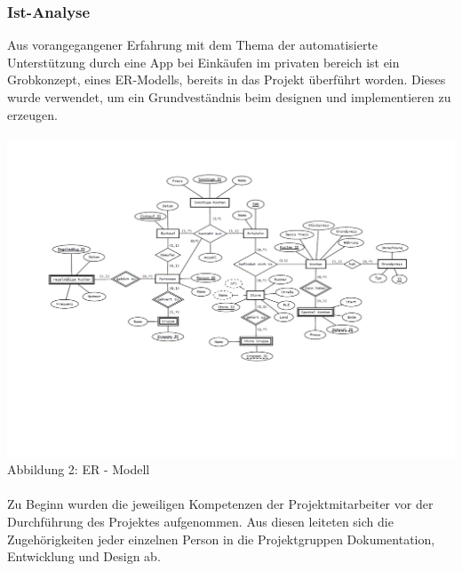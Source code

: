 \documentclass[12pt,a4paper]{article}
\begin{document}
\subsubsection{Ist-Analyse}
Aus vorangegangener Erfahrung mit dem Thema der automatisierte Unterstützung durch eine App bei Einkäufen im privaten bereich ist ein Grobkonzept, eines ER-Modells, bereits in das Projekt überführt worden. Dieses wurde verwendet, um ein Grundveständnis beim designen und implementieren zu erzeugen. 
\\
\\
\hspace*{-20mm} 
\includegraphics[trim = 15mm 40mm 0mm 20mm, clip, scale=0.7]{ER-Modell.pdf}
\linebreak
\footnotesize Abbildung 2: ER - Modell
\\
\normalsize
\linebreak
\\
Zu Beginn wurden die jeweiligen Kompetenzen der Projektmitarbeiter vor der Durchführung des Projektes aufgenommen. 
Aus diesen leiteten sich die Zugehörigkeiten jeder einzelnen Person in die Projektgruppen Dokumentation, Entwicklung und Design ab. 
\\
\\
\end{document}
